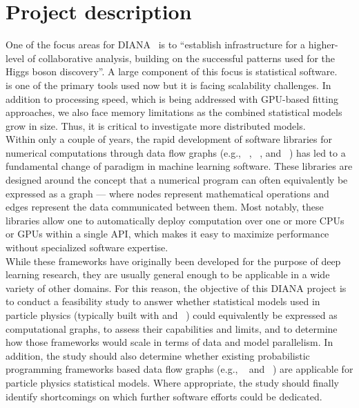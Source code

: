 \section{Project description}

One of the focus areas for DIANA~\cite{DIANA-proposal-2014} is to ``establish infrastructure for a higher-level of collaborative analysis, building on the successful patterns used for the Higgs boson discovery''.
A large component of this focus is statistical software.
~\cite{Verkerke:2003ir} is one of the primary tools used now but it is facing scalability challenges.
In addition to processing speed, which is being addressed with GPU-based fitting approaches, we also face memory limitations as the combined statistical models grow in size.
Thus, it is critical to investigate more distributed models.\\

Within only a couple of years, the rapid development of software libraries for numerical computations through data flow graphs (e.g., ~\cite{tensorflow2015-whitepaper}, ~\cite{theano-full}, and ~\cite{DBLP:journals/corr/ChenLLLWWXXZZ15}) has led to a fundamental change of paradigm in machine learning software.
These libraries are designed around the concept that a numerical program can often equivalently be expressed as a graph --- where nodes represent mathematical operations and edges represent the data communicated between them.
Most notably, these libraries allow one to automatically deploy computation over one or more CPUs or GPUs within a single API, which makes it easy to maximize performance without specialized software expertise.\\

While these frameworks have originally been developed for the purpose of deep learning research, they are usually general enough to be applicable in a wide variety of other domains.
For this reason, the objective of this DIANA project is to conduct a feasibility study to answer whether statistical models used in particle physics (typically built with  and ~\cite{Cranmer:2012sba}) could equivalently be expressed as computational graphs, to assess their capabilities and limits, and to determine how those frameworks would scale in terms of data and model parallelism.
In addition, the study should also determine whether existing probabilistic programming frameworks based data flow graphs (e.g., ~\cite{tran2016edward} and ~\cite{tensorprob2016}) are applicable for particle physics statistical models.
Where appropriate, the study should finally identify shortcomings on which further software efforts could be dedicated.\\

